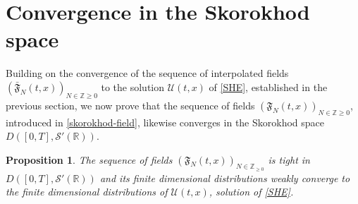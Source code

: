 \documentclass[a4paper,11pt,oneside,reqno]{amsart}
\newtheorem{proposition}[theorem]{Proposition}
\theoremstyle{definition}
\renewcommand{\geq}{\geqslant}
\numberwithin{equation}{section}
\begin{document}
\section{Convergence in the Skorokhod space}\label{section-skorokhod}
Building on the convergence of the sequence of interpolated fields $\left(\bar{\mathfrak{F}}_{N}(t,x)\right)_{N\in \mathbb{Z}{\geq 0}}$ to the solution $\mathcal{U}(t,x)$ of \eqref{SHE}, established in the previous section, we now prove that the sequence of fields $\left(\mathfrak{F}_{N}(t,x)\right)_{N\in \mathbb{Z}{\geq 0}}$, introduced in \eqref{skorokhod-field}, likewise converges in the Skorokhod space $D([0,T],\mathcal{S}'(\mathbb{R}))$.
\begin{proposition}\label{proposition-skorokhod}
The sequence of fields $\left(\mathfrak{F}_{N}(t,x)\right)_{N\in \mathbb{Z}_{\geq 0}}$ is tight in $D([0,T],\mathcal{S}
'(\mathbb{R}))$ and its finite dimensional distributions weakly converge to the finite dimensional distributions of $\mathcal{U}(t,x)$, solution of \eqref{SHE}.  
\end{proposition}
\end{document}

